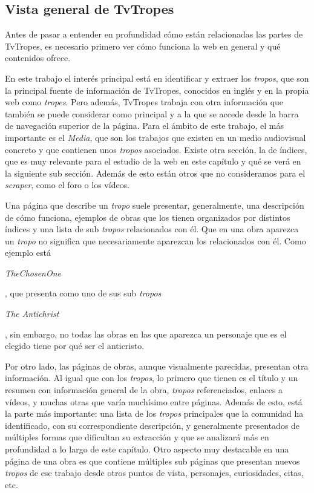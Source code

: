 \subsection{Vista general de TvTropes}
Antes de pasar a entender en profundidad cómo están relacionadas las partes de
TvTropes, es necesario primero ver cómo funciona la web en general y qué
contenidos ofrece.

En este trabajo el interés principal está en identificar y extraer los
\textit{tropos}, que son la principal fuente de información de TvTropes,
conocidos en inglés y en la propia web como \textit{tropes}. Pero además,
TvTropes trabaja con otra información que también se puede considerar como
principal y a la que se accede desde la barra de navegación superior de la
página. Para el ámbito de este trabajo, el más importante es el \textit{Media},
que son los trabajos que existen en un medio audiovisual concreto y que
contienen unos \textit{tropos} asociados. Existe otra sección, la de índices,
que es muy relevante para el estudio de la web en este capítulo y qué se verá en
la siguiente sub sección. Además de esto están otros que no consideramos para el
\textit{scraper}, como el foro o los vídeos.

Una página que describe un \textit{tropo} suele presentar, generalmente, una
descripción de cómo funciona, ejemplos de obras que los tienen organizados por
distintos índices y una lista de sub \textit{tropos} relacionados con él. Que en
una obra aparezca un \textit{tropo} no significa que necesariamente aparezcan
los relacionados con él. Como ejemplo está
\begin{otherlanguage}{english}\textit{TheChosenOne}\end{otherlanguage}, que
presenta como uno de sus sub \textit{tropos}
\begin{otherlanguage}{english}\textit{The Antichrist}\end{otherlanguage}, sin
embargo, no todas las obras en las que aparezca un personaje que es el elegido
tiene por qué ser el anticristo.

Por otro lado, las páginas de obras, aunque visualmente parecidas, presentan
otra información. Al igual que con los \textit{tropos}, lo primero que tienen es
el título y un resumen con información general de la obra, \textit{tropos}
referenciados, enlaces a vídeos, y muchas otras que varía muchísimo entre
páginas. Además de esto, está la parte más importante: una lista de los
\textit{tropos} principales que la comunidad ha identificado, con su
correspondiente descripción, y generalmente presentados de múltiples formas que
dificultan su extracción y que se analizará más en profundidad a lo largo de
este capítulo. Otro aspecto muy destacable en una página de una obra es que
contiene múltiples sub páginas que presentan nuevos \textit{tropos} de ese
trabajo desde otros puntos de vista, personajes, curiosidades, citas, etc.

